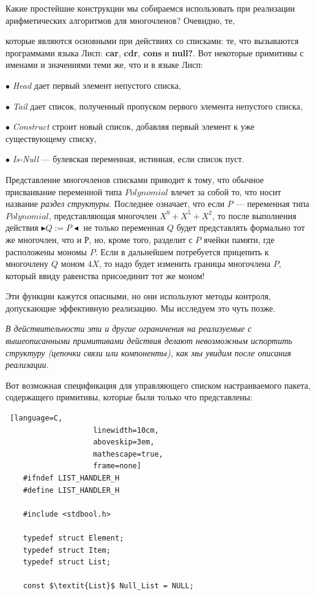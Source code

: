 \documentclass{../../template/mai_book}
\begin{document}
Какие простейшие конструкции мы собираемся использовать при реализации арифметических алгоритмов для многочленов? Очевидно, те,\linebreak

\newpage


\noindent
которые являются основными при действиях со списками: те, что вызываются программами языка Лисп: \textbf{car}, \textbf{cdr}, \textbf{cons} и \textbf{null?}. Вот некоторые примитивы с именами и значениями теми же, что и в языке Лисп:

$\bullet$ \textit{Head} дает первый элемент непустого списка,

$\bullet$ \textit{Tail} дает список, полученный пропуском первого элемента 
непустого списка,

$\bullet$ \textit{Construct} строит новый список, добавляя первый элемент к уже существующему списку,

$\bullet$ \textit{Is-Null} — булевская переменная, истинная, если список пуст.

Представление многочленов списками приводит к тому, что обычное присваивание переменной типа $Polynomial$ влечет за собой то, что носит название \textit{раздел структуры}. Последнее означает, что если $P$ — переменная типа $Polynomial$, представляющая многочлен $X^9 + X^5 + X^2$, то после выполнения действия $\blacktriangleright Q := P \blacktriangleleft$ не только переменная $Q$ будет представлять формально тот же многочлен, что и Р, но, кроме того, разделит с $P$ ячейки памяти, где расположены мономы $P$. Если в дальнейшем потребуется прицепить к многочлену $Q$ моном $4X$, то надо будет изменить границы многочлена $P$, который ввиду равенства присоединит тот же моном!

Эти функции кажутся опасными, но они используют методы контроля, допускающие эффективную реализацию. Мы исследуем это чуть позже.

\textit{В действительности эти и другие ограничения на реализуемые с вышеописанными примитивами действия делают невозможным испортить структуру (цепочки связи или компоненты), как мы увидим после описания реализации.}

Вот возможная спецификация для управляющего списком настраиваемого пакета, содержащего примитивы, которые были только что представлены:

\begin{lstlisting} [language=C,
					linewidth=10cm,
					aboveskip=3em,
					mathescape=true,
					frame=none]
	#ifndef LIST_HANDLER_H
	#define LIST_HANDLER_H
	
	#include <stdbool.h>

	typedef struct Element;
	typedef struct Item;
	typedef struct List;
	
	const $\textit{List}$ Null_List = NULL;
\end{lstlisting}
\end{document}
